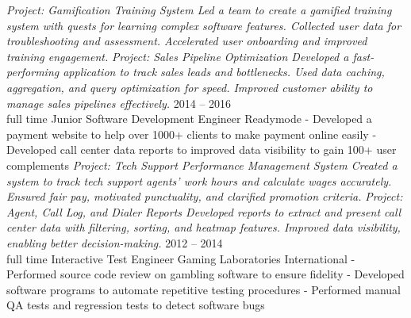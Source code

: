 \documentclass[9pt]{developercv} %
\begin{document}
\begin{entrylist}
{            \textit{Project: Gamification Training System\newline
            Led a team to create a gamified training system with quests for learning complex software features. 
            Collected user data for troubleshooting and assessment. 
            Accelerated user onboarding and improved training engagement. \newline\newline}
            \textit{Project: Sales Pipeline Optimization\newline
            Developed a fast-performing application to track sales leads and bottlenecks. 
            Used data caching, aggregation, and query optimization for speed. 
            Improved customer ability to manage sales pipelines effectively.\newline}
        }
	\entry
		{2014 -- 2016\\\footnotesize{full time}}
		{Junior Software Development Engineer}
		{Readymode}
		{
            - Developed a payment website to help over 1000+ clients to make payment online easily\newline
            - Developed call center data reports to improved data visibility to gain 100+ user complements\newline
            \newline
            \textit{Project: Tech Support Performance Management System\newline
            Created a system to track tech support agents' work hours and calculate wages accurately. 
            Ensured fair pay, motivated punctuality, and clarified promotion criteria.
            \newline\newline}
            \textit{Project: Agent, Call Log, and Dialer Reports\newline
            Developed reports to extract and present call center data with filtering, sorting, and heatmap features. 
            Improved data visibility, enabling better decision-making.\newline}
        }
    \entry
		{2012 -- 2014\\\footnotesize{full time}}
		{Interactive Test Engineer}
		{Gaming Laboratories International}
		{
            - Performed source code review on gambling software to ensure fidelity\newline
            - Developed software programs to automate repetitive testing procedures\newline
            - Performed manual QA tests and regression tests to detect software bugs\newline
        }
\end{entrylist}
\end{document}

